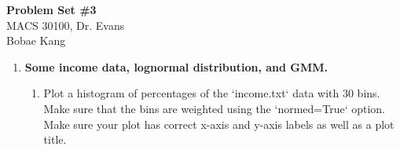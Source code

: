 \documentclass[letterpaper,12pt]{article}
\theoremstyle{definition}
\begin{document}
\begin{flushleft}
  \textbf{\large{Problem Set \#3}} \\
  MACS 30100, Dr. Evans \\
  Bobae Kang
\end{flushleft}

\vspace{5mm}

\begin{enumerate}
\item \textbf{Some income data, lognormal distribution, and GMM.}
\begin{enumerate}
\item Plot a histogram of percentages of the `income.txt` data with 30 bins. Make sure that the bins are weighted using the `normed=True` option. Make sure your plot has correct x-axis and y-axis labels as well as a plot title.
\par\bigskip
\begin{figure}[H]\centering\captionsetup{width=4.0in}
\end{figure}
\par\bigskip


\end{enumerate}
\end{enumerate}
\end{document}
